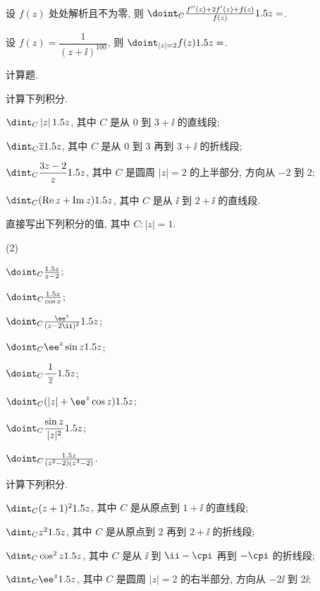 \begin{homework}
\begin{homework}
    \item 设 $f(z)$ 处处解析且不为零, 则 $\doint_C\frac{f''(z)+2f'(z)+f(z)}{f(z)}\d z=$\fillblank{}.
    \item 设 $f(z)=\dfrac1{(z+\ii)^{100}}$, 则 $\doint_{|z|=2}f(z)\d z=$\fillblank{}.
  \end{homework}
  \item 计算题.
  \begin{homework}
    \item 计算下列积分.
      \begin{subhomework}
        \item $\dint_C \abs{z}\d z$, 其中 $C$ 是从 $0$ 到 $3+\ii$ 的直线段;
        \item $\dint_C \ov z\d z$, 其中 $C$ 是从 $0$ 到 $3$ 再到 $3+\ii$ 的折线段;
        \item $\dint_C\dfrac{3z-2}{z}\d z$, 其中 $C$ 是圆周 $|z|=2$ 的上半部分, 方向从 $-2$ 到 $2$;
        \item $\dint_C(\Re z+\Im z)\d z$, 其中 $C$ 是从 $\ii$ 到 $2+\ii$ 的直线段.
      \end{subhomework}
    \item 直接写出下列积分的值, 其中 $C:|z|=1$.
      \begin{subhomework}(2)
        \item $\doint_C\frac{\d z}{z-2}$;
        \item $\doint_C\frac{\d z}{\cos z}$;
        \item $\doint_C\frac{\ee^z}{(z-2\ii)^2}\d z$;
        \item $\doint_C\ee^z\sin z\d z$;
        \item $\doint_C\dfrac{~1~}{\ov z}\d z$;
        \item $\doint_C(|z|+\ee^z\cos z)\d z$;
        \item $\doint_C\dfrac{\sin z}{|z|^2}\d z$;
        \item $\doint_C\frac{\d z}{(z^2-2)(z^3-2)}$.
      \end{subhomework}
    \item 计算下列积分.
      \begin{subhomework}
        \item $\dint_C(z+1)^2\d z$, 其中 $C$ 是从原点到 $1+\ii$ 的直线段;
        \item $\dint_Cz^2\d z$, 其中 $C$ 是从原点到 $2$ 再到 $2+\ii$ 的折线段;
        \item $\dint_C\cos^2z\d z$, 其中 $C$ 是从 $\ii$ 到 $\ii-\cpi$ 再到 $-\cpi$ 的折线段;
        \item $\dint_C \ee^z\d z$, 其中 $C$ 是圆周 $|z|=2$ 的右半部分, 方向从 $-2\ii$ 到 $2\ii$;

\end{subhomework}
\end{homework}
\end{homework}
